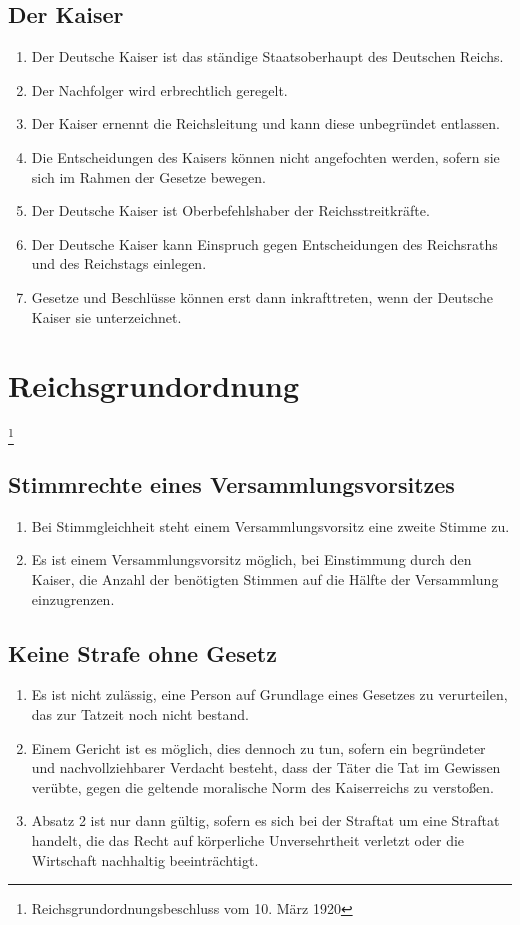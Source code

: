 \documentclass{article}
\newenvironment*{pg}{\begin{enumerate}[(1)]}{\end{enumerate}}
\begin{document}
\subsection{Der Kaiser}
\begin{pg}
    \item Der Deutsche Kaiser ist das ständige Staatsoberhaupt des Deutschen Reichs.
    \item Der Nachfolger wird erbrechtlich geregelt.
    \item Der Kaiser ernennt die Reichsleitung und kann diese unbegründet entlassen.
    \item Die Entscheidungen des Kaisers können nicht angefochten werden, sofern sie sich im Rahmen der Gesetze bewegen.
    \item Der Deutsche Kaiser ist Oberbefehlshaber der Reichsstreitkräfte.
    \item Der Deutsche Kaiser kann Einspruch gegen Entscheidungen des Reichsraths und des Reichstags einlegen.
    \item Gesetze und Beschlüsse können erst dann inkrafttreten, wenn der Deutsche Kaiser sie unterzeichnet.
\end{pg}

\section{Reichsgrundordnung}\footnote{Reichsgrundordnungsbeschluss vom 10. März 1920}
\subsection{Stimmrechte eines Versammlungsvorsitzes}
\begin{enumerate}[(1)]
    \item Bei Stimmgleichheit steht einem Versammlungsvorsitz eine zweite Stimme zu.
    \item Es ist einem Versammlungsvorsitz möglich, bei Einstimmung durch den Kaiser, die Anzahl der benötigten Stimmen auf die Hälfte der Versammlung einzugrenzen.
\end{enumerate}

\subsection{Keine Strafe ohne Gesetz}
\begin{enumerate}[(1)]
    \item Es ist nicht zulässig, eine Person auf Grundlage eines Gesetzes zu verurteilen, das zur Tatzeit noch nicht bestand.
    \item Einem Gericht ist es möglich, dies dennoch zu tun, sofern ein begründeter und nachvollziehbarer Verdacht besteht, dass der Täter die Tat im Gewissen verübte, gegen die geltende moralische Norm des Kaiserreichs zu verstoßen.
    \item Absatz 2 ist nur dann gültig, sofern es sich bei der Straftat um eine Straftat handelt, die das Recht auf körperliche Unversehrtheit verletzt oder die Wirtschaft nachhaltig beeinträchtigt.
\end{enumerate}
\end{document}
